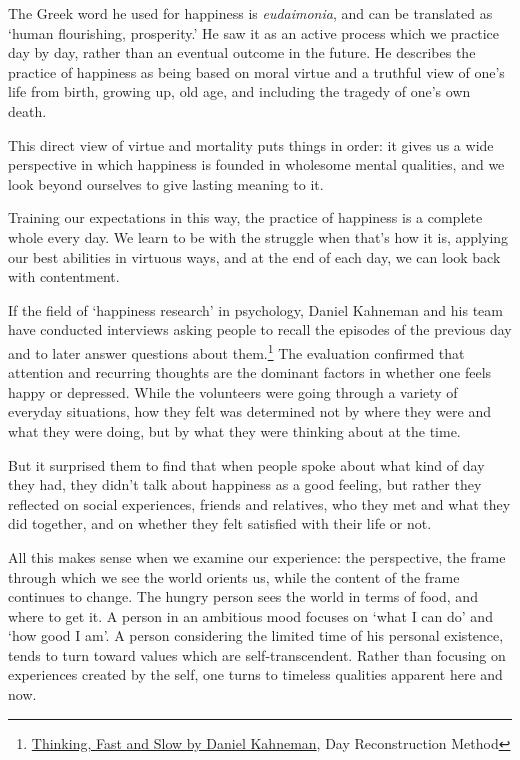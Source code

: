 The Greek word he used for happiness is \emph{eudaimonia}, and can be
translated as `human flourishing, prosperity.' He saw it as
an active process which we practice day by day, rather than
an eventual outcome in the future. He describes the practice of
happiness as being based on moral virtue and a truthful view of one's
life from birth, growing up, old age, and including the tragedy of one's
own death.

\enlargethispage*{2\baselineskip}

This direct view of virtue and mortality puts things in order: it gives
us a wide perspective in which happiness is founded in wholesome mental
qualities, and we look beyond ourselves to give lasting meaning to it.

Training our expectations in this way, the practice of happiness is a
complete whole every day. We learn to be with the struggle when that's
how it is, applying our best abilities in virtuous ways, and at the end
of each day, we can look back with contentment.

If the field of `happiness research' in psychology, Daniel Kahneman and
his team have conducted interviews asking people to recall the episodes
of the previous day and to later answer questions about them.\footnote{\href{https://www.goodreads.com/book/show/11468377-thinking-fast-and-slow}{Thinking,
  Fast and Slow by Daniel Kahneman}, Day Reconstruction Method} The
evaluation confirmed that attention and recurring thoughts are the
dominant factors in whether one feels happy or depressed. While the
volunteers were going through a variety of everyday situations, how they
felt was determined not by where they were and what they were doing, but
by what they were thinking about at the time.


\enlargethispage*{3\baselineskip}

But it surprised them to find that when people spoke about what kind of
day they had, they didn't talk about happiness as a good feeling, but
rather they reflected on social experiences, friends and relatives, who
they met and what they did together, and on whether they felt satisfied
with their life or not.

All this makes sense when we examine our experience: the perspective,
the frame through which we see the world orients us, while the content
of the frame continues to change. The hungry person sees the world in
terms of food, and where to get it. A person in an ambitious mood
focuses on `what I can do' and `how good I am'. A person considering the
limited time of his personal existence, tends to turn toward values
which are self-transcendent. Rather than focusing on experiences created
by the self, one turns to timeless qualities apparent here and now.

